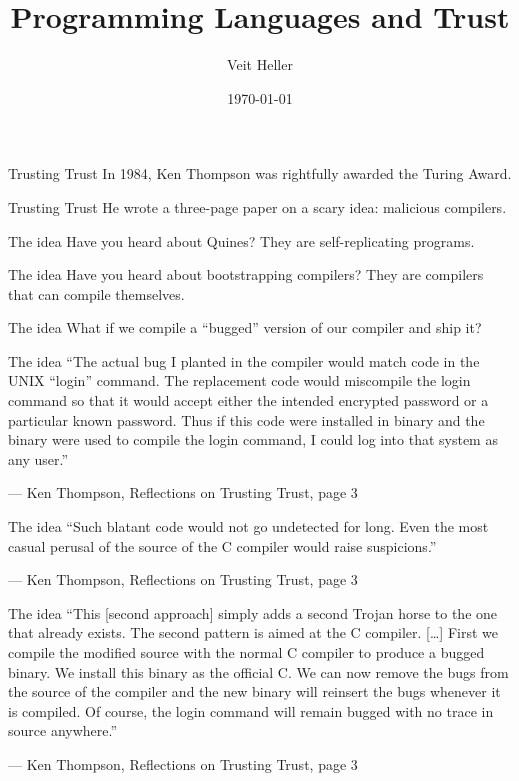 \documentclass[aspectratio=169]{beamer}
\title{Programming Languages and Trust}
\date{\today}
\author{Veit Heller}
\institute{Internet Security Meetup Berlin}
\begin{document}
  \maketitle
  \begin{frame}{Trusting Trust}
    In 1984, Ken Thompson was rightfully awarded the Turing Award.
  \end{frame}
  \begin{frame}{Trusting Trust}
    He wrote a three-page paper on a scary idea: malicious compilers.
  \end{frame}
  \begin{frame}{The idea}
    Have you heard about Quines? They are self-replicating programs.
  \end{frame}
  \begin{frame}{The idea}
    Have you heard about bootstrapping compilers? They are compilers that can
    compile themselves.
  \end{frame}
  \begin{frame}{The idea}
    What if we compile a “bugged” version of our compiler and ship it?
  \end{frame}
  \begin{frame}{The idea}
    “The actual bug I planted in the compiler would match code in the UNIX
     “login” command.  The replacement code would miscompile the login
     command so that it would accept either the intended encrypted password
     or a particular known password. Thus if this code were installed in
     binary and the binary were used to compile the login command, I could
     log into that system as any user.”

     \indent — Ken Thompson, Reflections on Trusting Trust, page 3
  \end{frame}
  \begin{frame}{The idea}
    “Such blatant code would not go undetected for long. Even the most casual
     perusal of the source of the C compiler would raise suspicions.” 

     \indent — Ken Thompson, Reflections on Trusting Trust, page 3
  \end{frame}
  \begin{frame}{The idea}
    “This [second approach] simply adds a second Trojan horse to the one that
     already exists. The second pattern is aimed at the C compiler. [\ldots] First
     we compile the modified source with the normal C compiler to produce a
     bugged binary. We install this binary as the official C. We can now remove
     the bugs from the source of the compiler and the new binary will reinsert
     the bugs whenever it is compiled. Of course, the login command will remain
     bugged with no trace in source anywhere.”

     \indent — Ken Thompson, Reflections on Trusting Trust, page 3
  \end{frame}
\end{document}
